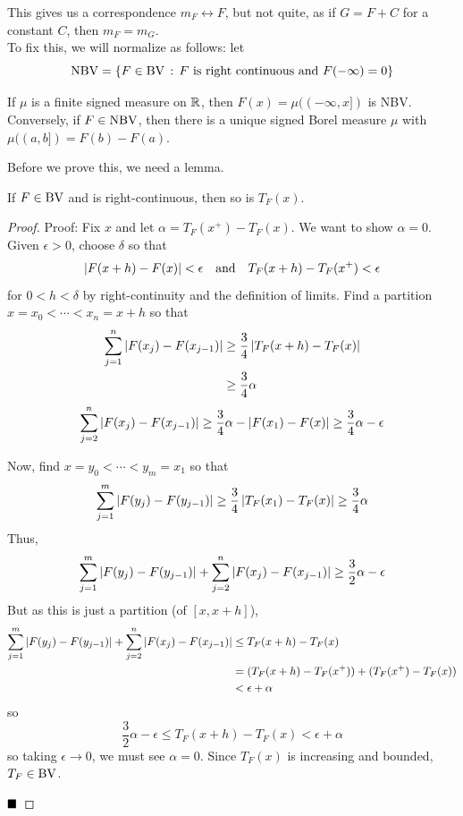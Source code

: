 This gives us a correspondence $m_F \longleftrightarrow F$, but not quite, as if $G = F + C$ for a constant $C$, then $m_F = m_G$.\\

To fix this, we will normalize as follows: let
\[ \tt{NBV} = \{F \in \tt{BV} \col F \tt{ is right continuous and } F(-\infty) = 0\} \]

\begin{theorem}
    If $\mu$ is a finite signed measure on $\R$, then $F(x) = \mu((-\infty, x])$ is NBV. Conversely, if $F \in \tt{NBV}$, then there is a unique signed Borel measure $\mu$ with $\mu((a, b]) = F(b) - F(a)$.
\end{theorem}

Before we prove this, we need a lemma.

\begin{lemma}
    If $F \in \tt{BV}$ and is right-continuous, then so is $T_F(x)$. \
\end{lemma}
\begin{proof}{Proof:}
    Fix $x$ and let $\alpha = T_F(x^{+}) - T_F(x)$. We want to show $\alpha = 0$. Given $\epsilon > 0$, choose $\delta$ so that
    \[ \abs{F(x + h) - F(x)} < \epsilon \quand T_F(x + h) - T_F(x^{+}) < \epsilon \]
    for $0 < h < \delta$ by right-continuity and the definition of limits. Find a partition $x = x_0 < \cdots < x_n = x + h$ so that
    \begin{align*}
        \sum_{j = 1}^{n} \abs{F(x_j) - F(x_{j - 1})} &\geq \frac{3}{4}\abs{T_F(x + h) - T_F(x)}\\
        &\geq \frac{3}{4}\alpha
    \end{align*}
    \[ \sum_{j = 2}^{n} \abs{F(x_j) - F(x_{j - 1})} \geq \frac{3}{4}\alpha - \abs{F(x_1) - F(x)} \geq \frac{3}{4}\alpha - \epsilon \]

    Now, find $x = y_0 < \cdots < y_m = x_1$ so that
    \[ \sum_{j = 1}^{m} \abs{F(y_j) - F(y_{j - 1})} \geq \frac{3}{4}\abs{T_F(x_1) - T_F(x)} \geq \frac{3}{4}\alpha \]
    Thus,
    \[ \sum_{j = 1}^{m} \abs{F(y_j) - F(y_{j - 1})} + \sum_{j = 2}^{n} \abs{F(x_j) - F(x_{j - 1})} \geq \frac{3}{2}\alpha - \epsilon \]
    But as this is just a partition (of $[x, x + h]$),
    \begin{align*}
        \sum_{j = 1}^{m} \abs{F(y_j) - F(y_{j - 1})} + \sum_{j = 2}^{n} \abs{F(x_j) - F(x_{j - 1})} &\leq T_F(x + h) - T_F(x)\\
        &= (T_F(x + h) - T_F(x^{+})) + (T_F(x^{+}) - T_F(x))\\
        &< \epsilon + \alpha
    \end{align*}
    so
    \[ \frac{3}{2}\alpha - \epsilon \leq T_F(x + h) - T_F(x) < \epsilon + \alpha \]
    so taking $\epsilon \to 0$, we must see $\alpha = 0$. Since $T_F(x)$ is increasing and bounded, $T_F \in \tt{BV}$.

    $\qed$
\end{proof}

